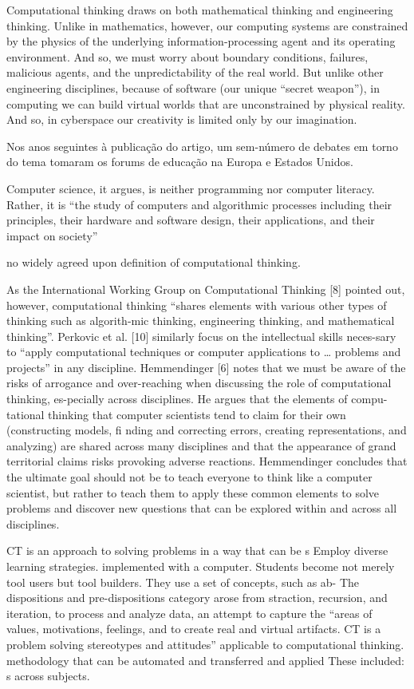 \documentclass{book}
\begin{document}
Computational thinking draws on both mathematical thinking and engineering thinking. Unlike in mathematics, however, our computing systems are constrained by the physics of the underlying information-processing agent and its operating environment. And so, we must worry about boundary conditions, failures, malicious agents, and the unpredictability of the real world. But unlike other engineering disciplines, because of software (our unique “secret weapon”), in computing we can build virtual worlds that are unconstrained by physical reality. And so, in cyberspace our creativity is limited only by our imagination.



Nos anos seguintes à publicação do artigo, um sem-número de debates em torno 
do tema tomaram os forums de educação na Europa e Estados Unidos. 



Computer science, it argues, is neither programming nor computer literacy. Rather, it is “the study of computers and algorithmic processes including their principles, their hardware and software design, their applications, and their impact on society”

no widely agreed upon definition of computational thinking.

As the International Working Group on Computational Thinking [8] pointed out, however, computational thinking “shares elements with various other types of thinking such as algorith-mic thinking, engineering thinking, and mathematical thinking”. Perkovic et al. [10] similarly focus on the intellectual skills neces-sary to “apply computational techniques or computer applications to … problems and projects” in any discipline. Hemmendinger [6] notes that we must be aware of the risks of arrogance and over-reaching when discussing the role of computational thinking, es-pecially across disciplines. He argues that the elements of compu-tational thinking that computer scientists tend to claim for their own (constructing models, fi nding and correcting errors, creating representations, and analyzing) are shared across many disciplines and that the appearance of grand territorial claims risks provoking adverse reactions. Hemmendinger concludes that the ultimate goal should not be to teach everyone to think like a computer scientist, but rather to teach them to apply these common elements to solve problems and discover new questions that can be explored within and across all disciplines.

CT is an approach to solving problems in a way that can be s Employ diverse learning strategies. implemented with a computer. Students become not merely tool users but tool builders. They use a set of concepts, such as ab- The dispositions and pre-dispositions category arose from straction, recursion, and iteration, to process and analyze data, an attempt to capture the “areas of values, motivations, feelings, and to create real and virtual artifacts. CT is a problem solving stereotypes and attitudes” applicable to computational thinking. methodology that can be automated and transferred and applied These included: s across subjects.
\end{document}
